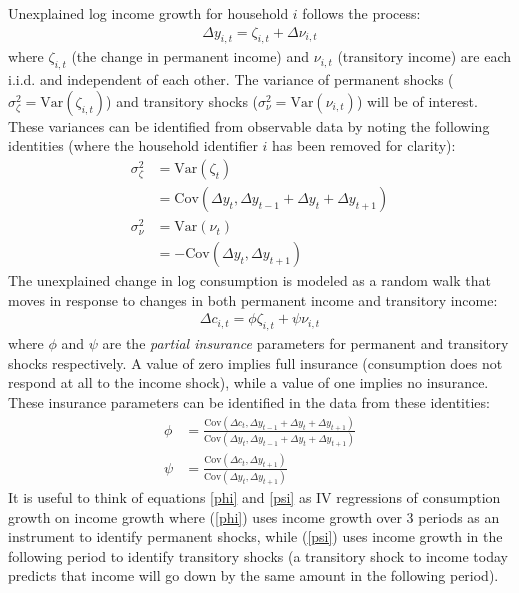 Unexplained log income growth for household $i$ follows the process:
\begin{align*}
\Delta y_{i,t} = \zeta_{i,t} + \Delta \nu_{i,t}
\end{align*}
where $\zeta_{i,t}$ (the change in permanent income) and $\nu_{i,t}$ (transitory income) are each i.i.d. and independent of each other. The variance of permanent shocks ($\sigma^2_{\zeta}=\mathrm{Var}(\zeta_{i,t})$) and transitory shocks ($\sigma^2_{\nu}=\mathrm{Var}(\nu_{i,t})$) will be of interest. These variances can be identified from observable data by noting the following identities (where the household identifier $i$ has been removed for clarity):
\begin{align}
\sigma^2_{\zeta}&=\mathrm{Var}(\zeta_{t}) \nonumber \\
&= \mathrm{Cov}(\Delta y_{t}, \Delta y_{t-1}+\Delta y_{t}+\Delta y_{t+1}) \label{perm_var}\\
\sigma^2_{\nu}&=\mathrm{Var}(\nu_{t}) \nonumber \\
&= -\mathrm{Cov}(\Delta y_{t},\Delta y_{t+1}) \label{tran_var}
\end{align}
The unexplained change in log consumption is modeled as a random walk that moves in response to changes in both permanent income and transitory income:
\begin{align*}
\Delta c_{i,t} = \phi \zeta_{i,t} + \psi \nu_{i,t} 
\end{align*}
where $\phi$ and $\psi$ are the \textit{partial insurance} parameters for permanent and transitory shocks respectively. A value of zero implies full insurance (consumption does not respond at all to the income shock), while a value of one implies no insurance. These insurance parameters can be identified in the data from these identities:
\begin{align}
\phi&= \frac{\mathrm{Cov}(\Delta c_{t}, \Delta y_{t-1}+\Delta y_{t}+\Delta y_{t+1})}{\mathrm{Cov}(\Delta y_{t}, \Delta y_{t-1}+\Delta y_{t}+\Delta y_{t+1})} \label{phi}\\
\psi&= \frac{\mathrm{Cov}(\Delta c_{t},\Delta y_{t+1})}{\mathrm{Cov}(\Delta y_{t},\Delta y_{t+1})} \label{psi}
\end{align}
It is useful to think of equations \ref{phi} and \ref{psi} as IV regressions of consumption growth on income growth where (\ref{phi}) uses income growth over 3 periods as an instrument to identify permanent shocks, while (\ref{psi}) uses income growth in the following period to identify transitory shocks (a transitory shock to income today predicts that income will go down by the same amount in the following period).

